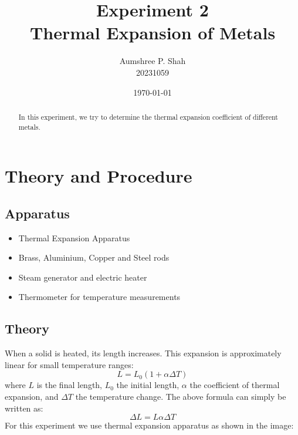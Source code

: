 \documentclass[%
 sor,
 jor,
 amsmath,amssymb,
 reprint,
]{revtex4-2}
\begin{document}
\title{Experiment 2\\Thermal Expansion of Metals}

\author{Aumshree P. Shah\\20231059}
\date{\today}

\begin{abstract}
\centering
In this experiment, we try to determine the thermal expansion coefficient of different metals.
\end{abstract}

\maketitle

\section{Theory and Procedure}
\subsection{Apparatus}
\small
\begin{minipage}{0.48\textwidth}
\begin{itemize}
	\item[] Thermal Expansion Apparatus
	\item[] Brass, Aluminium, Copper and Steel rods 
\end{itemize}
\end{minipage}
\begin{minipage}{0.48\textwidth}
\begin{itemize}
	\item[] Steam generator and electric heater
		\item[] Thermometer for temperature measurements
\end{itemize}
\end{minipage}
\subsection{Theory}
When a solid is heated, its length increases. This expansion is approximately linear for small temperature ranges:
\begin{equation}
L = L_0 (1 + \alpha \Delta T)
\end{equation}
where $L$ is the final length, $L_0$ the initial length, $\alpha$ the coefficient of thermal expansion, and $\Delta T$ the temperature change.
The above formula can simply be written as: $$\Delta L = L \alpha \Delta T $$ For this experiment we use thermal expansion apparatus as shown in the image:\\
\end{document}

